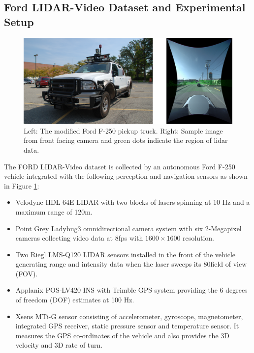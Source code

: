 \documentclass{article}
\begin{document}
\subsection{Ford LIDAR-Video Dataset and Experimental Setup} %
\label{sub:ford_lidar_video_dataset_and_experimental_setup}

\begin{figure}[htbp]
    \centering
        \includegraphics[scale=0.45]{Figures/ford-truck-sensors-final.png}
    \caption{Left: The modified Ford F-250 pickup truck. Right: Sample image from front facing camera and green dots indicate the region of lidar data.}
    \label{fig:ford-truck-sensors}
\end{figure}

The FORD LIDAR-Video dataset \cite{Pandey2011Ford-campu} is collected by an autonomous Ford F-250 vehicle integrated with the following perception and navigation sensors as shown in Figure \ref{fig:ford-truck-sensors}:
\begin{itemize}
    \item Velodyne HDL-64E LIDAR with two blocks of lasers spinning at 10 Hz and a maximum range of 120m.
    \item Point Grey Ladybug3 omnidirectional camera system with six 2-Megapixel cameras collecting video data at 8fps with $1600\times1600$ resolution.
    \item Two Riegl LMS-Q120 LIDAR sensors installed in the front of the vehicle generating range and intensity data when the laser sweeps its 80\degree field of view (FOV).
    \item Applanix POS-LV420 INS with Trimble GPS system providing the 6 degrees of freedom (DOF) estimates at 100 Hz.
    \item Xsens MTi-G sensor consisting of accelerometer, gyroscope, magnetometer, integrated GPS receiver, static pressure sensor and temperature sensor. It measures the GPS co-ordinates of the vehicle and also provides the 3D velocity and 3D rate of turn.
\end{itemize}
\end{document}
